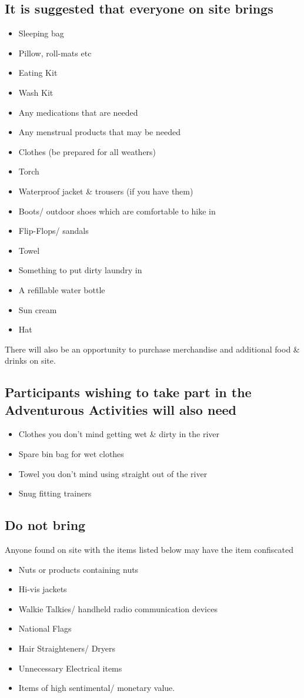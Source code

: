 \documentclass[a4paper, 11pt]{report}
\begin{document}
\subsection{It is suggested that everyone on site brings}
\begin{itemize}
    \item Sleeping bag
    \item Pillow, roll-mats etc
    \item Eating Kit
    \item Wash Kit
    \item Any medications that are needed
    \item Any menstrual products that may be needed
    \item Clothes (be prepared for all weathers)
    \item Torch
    \item Waterproof jacket \& trousers (if you have them)
    \item Boots/ outdoor shoes which are comfortable to hike in
    \item Flip-Flops/ sandals
    \item Towel
    \item Something to put dirty laundry in
    \item A refillable water bottle
    \item Sun cream
    \item Hat
\end{itemize}
There will also be an opportunity to purchase merchandise and additional food \& drinks on site. 
\subsection{Participants wishing to take part in the Adventurous Activities will also need}
\begin{itemize}
    \item Clothes you don't mind getting wet \& dirty in the river
    \item Spare bin bag for wet clothes
    \item Towel you don't mind using straight out of the river
    \item Snug fitting trainers
\end{itemize}
\subsection{Do not bring}
Anyone found on site with the items listed below may have the item confiscated
\begin{itemize}
    \item Nuts or products containing nuts
    \item Hi-vis jackets
    \item Walkie Talkies/ handheld radio communication devices
    \item National Flags
    \item Hair Straighteners/ Dryers
    \item Unnecessary Electrical items
    \item Items of high sentimental/ monetary value.
\end{itemize}
\end{document}

